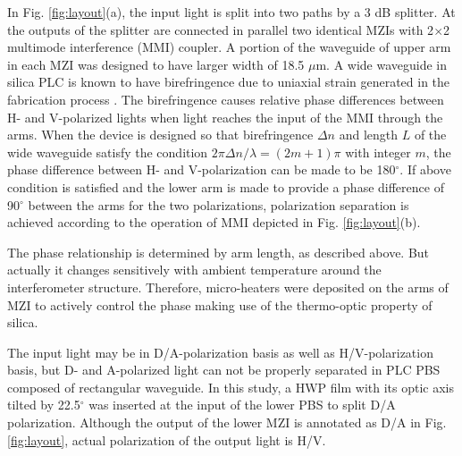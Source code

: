 \documentclass[letterpaper, 10pt]{article}
\begin{document}
In Fig. \ref{fig:layout}(a), the input light is split into two paths by a 3 dB splitter.
At the outputs of the splitter are connected in parallel two identical MZIs with 2$\times$2 multimode interference (MMI) coupler.
A portion of the waveguide of upper arm in each MZI was designed to have larger width of 18.5 $\mu$m.
A wide waveguide in silica PLC is known to have birefringence  due to uniaxial strain generated in the fabrication process \cite{Okuno:1994fm}.
The birefringence causes relative phase differences between H- and V-polarized lights when light reaches the  input of the MMI through the arms.
When the device is designed so that birefringence $\Delta n$ and length $L$ of the wide waveguide satisfy the condition $2\pi\Delta n/\lambda  = (2m+1) \pi$ with integer $m$, the phase difference between H- and V-polarization can be made to be 180$^\circ$.
If above condition is satisfied and the lower arm is made to provide a phase difference of 90$^\circ$ between the arms for the two polarizations, polarization separation is achieved according to the operation of MMI depicted in Fig. \ref{fig:layout}(b).


The phase relationship is determined by arm length, as described above.
But actually it changes sensitively with ambient temperature around the interferometer structure.
Therefore, micro-heaters were deposited on the arms of MZI to actively control the phase making use of the thermo-optic property of silica.

The input light may be in D/A-polarization basis as well as H/V-polarization basis, but D- and A-polarized light can not be properly separated in PLC PBS composed of rectangular waveguide.
In this study, a HWP film with its optic axis tilted by 22.5$^\circ$ was inserted at the input of the lower PBS to split D/A polarization.
Although the output of the lower MZI is annotated as D/A in Fig. \ref{fig:layout}, actual polarization of the output light is H/V.
\end{document}
